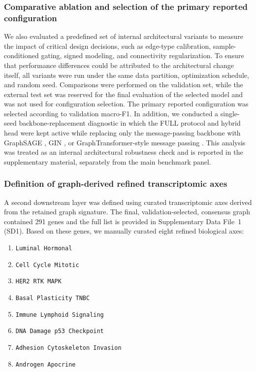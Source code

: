 \documentclass[unnumsec,webpdf,modern,large]{oup-authoring-template}
\newcounter{panel}
\begin{document}
\subsubsection{Comparative ablation and selection of the primary reported configuration}
We also evaluated a predefined set of internal architectural variants to measure the impact of critical design decisions, such as edge-type calibration, sample-conditioned gating, signed modeling, and connectivity regularization. To ensure that performance differences could be attributed to the architectural change itself, all variants were run under the same data partition, optimization schedule, and random seed. Comparisons were performed on the validation set, while the external test set was reserved for the final evaluation of the selected model and was not used for configuration selection. The primary reported configuration was selected according to validation macro-F1. In addition, we conducted a single-seed backbone-replacement diagnostic in which the FULL protocol and hybrid head were kept active while replacing only the message-passing backbone with GraphSAGE \citep{Hamilton2017GraphSAGE}, GIN \citep{Xu2019GIN}, or GraphTransformer-style message passing \citep{Shi2020TransformerConv,Dwivedi2020GraphTransformer}. This analysis was treated as an internal architectural robustness check and is reported in the supplementary material, separately from the main benchmark panel.

\subsubsection{Definition of graph-derived refined transcriptomic axes}
A second downstream layer was defined using curated transcriptomic axes derived from the retained graph signature. The final, validation-selected, consensus graph contained 291 genes and the full list is provided in Supplementary Data File~1 (SD1). Based on these genes, we manually curated eight refined biological axes:
\begin{enumerate}
    \item \texttt{Luminal Hormonal}
    \item \texttt{Cell Cycle Mitotic}
    \item \texttt{HER2 RTK MAPK}
    \item \texttt{Basal Plasticity TNBC}
    \item \texttt{Immune Lymphoid Signaling}
    \item \texttt{DNA Damage p53 Checkpoint}
    \item \texttt{Adhesion Cytoskeleton Invasion}
    \item \texttt{Androgen Apocrine}
\end{enumerate}
\end{document}
